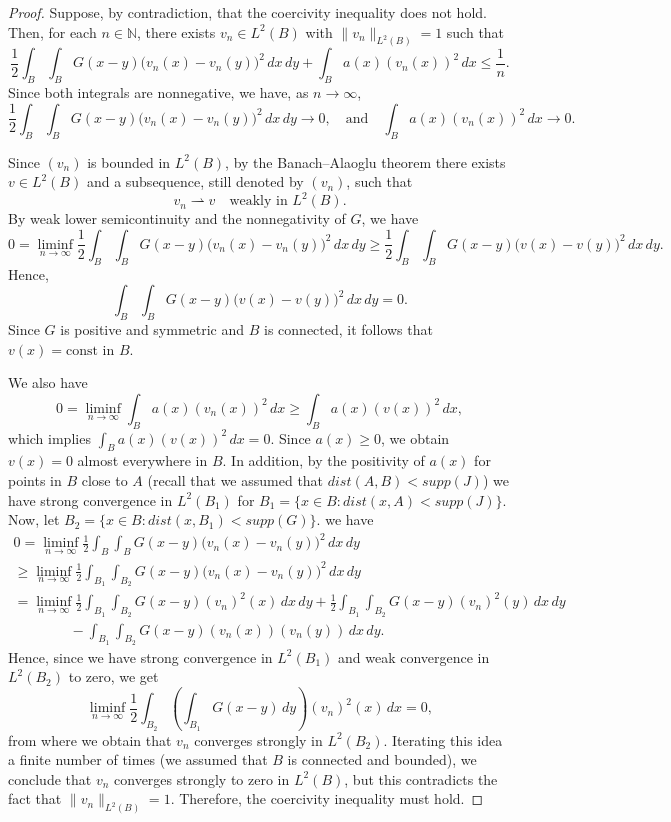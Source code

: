 \documentclass[reqno]{amsart}
\numberwithin{equation}{section}
\begin{document}
\begin{proof}
Suppose, by contradiction, that the coercivity inequality does not hold. 
Then, for each $n \in \mathbb{N}$, there exists $v_n \in L^2(B)$ with $\|v_n\|_{L^2(B)} = 1$ such that
\[
\frac{1}{2}\int_{B}\int_{B} G(x-y)\bigl(v_n(x)-v_n(y)\bigr)^2 \,dx\,dy
+ \int_B a(x) (v_n(x))^2 \,dx \le \frac{1}{n}.
\]
Since both integrals are nonnegative, we have, as $n \to \infty$, 
\[
\frac{1}{2}\int_{B}\int_{B} G(x-y)\bigl(v_n(x)-v_n(y)\bigr)^2 \,dx\,dy \longrightarrow 0,
\quad \text{and} \quad
\int_B a(x) (v_n(x))^2 \,dx \longrightarrow 0.
\]

Since $(v_n)$ is bounded in $L^2(B)$, by the Banach--Alaoglu theorem there exists $v \in L^2(B)$ and a subsequence, still denoted by $(v_n)$, such that
\[
v_n \rightharpoonup v \quad \text{weakly in } L^2(B).
\]
By weak lower semicontinuity and the nonnegativity of $G$, we have
\[
0 = \liminf_{n \to \infty} 
\frac{1}{2}\int_{B}\int_{B} G(x-y)\bigl(v_n(x)-v_n(y)\bigr)^2 \,dx\,dy
\ge \frac{1}{2}\int_{B}\int_{B} G(x-y)\bigl(v(x)-v(y)\bigr)^2 \,dx\,dy.
\]
Hence,
\[
\int_{B}\int_{B} G(x-y)\bigl(v(x)-v(y)\bigr)^2 \,dx\,dy = 0.
\]
Since $G$ is positive and symmetric and $B$ is connected, it follows that $v(x) = \text{const}$ in $B$. 

We also have
\[
0 = \liminf_{n \to \infty} \int_B a(x) (v_n(x))^2 \,dx 
\geq \int_B a(x) (v(x))^2 \,dx,
\]
which implies $\int_B a(x) (v(x))^2 \,dx = 0$.
Since $a(x) \ge 0$, we obtain $v(x) = 0$ almost everywhere in $B$.
In addition, by the positivity of $a(x)$ for points in $B$ close to $A$ (recall that we assumed that
$dist(A,B) < supp(J)$) we have strong convergence in $L^2 (B_1)$ for $B_1 = \{x\in B : dist(x,A) < supp(J)\}$.
Now, let $B_2 = \{x\in B : dist(x,B_1) < supp(G)\}$. we have
\[
\begin{array}{l}
\displaystyle 0 = \liminf_{n \to \infty} 
\frac{1}{2}\int_{B}\int_{B} G(x-y)\bigl(v_n(x)-v_n(y)\bigr)^2 \,dx\,dy \\[10pt]
\displaystyle
\geq \liminf_{n \to \infty} 
\frac{1}{2}\int_{B_1}\int_{B_2} G(x-y)\bigl(v_n(x)-v_n(y)\bigr)^2 \,dx\,dy
\\[10pt]
\displaystyle = 
\liminf_{n \to \infty} 
\frac{1}{2}\int_{B_1}\int_{B_2} G(x-y) (v_n)^2 (x) \,dx\,dy
+ \frac{1}{2}\int_{B_1}\int_{B_2} G(x-y) (v_n)^2 (y) \,dx\,dy 
\\[10pt]
\displaystyle \qquad \qquad - 
\int_{B_1}\int_{B_2} G(x-y) (v_n(x))(v_n(y)) \,dx\,dy.
\end{array}
\]
Hence, since we have strong convergence in $L^2 (B_1)$ and weak
convergence in $L^2 (B_2)$ to zero, we get
$$
\liminf_{n \to \infty} 
\frac{1}{2}\int_{B_2} \left(\int_{B_1} G(x-y) \, dy \right) (v_n)^2 (x) \,dx =0,
$$
from where we obtain that $v_n$ converges strongly in $L^2 (B_2)$. 
Iterating this idea a finite number of times (we assumed that $B$ is connected and bounded), we conclude that
$v_n$ converges strongly to zero in $L^2 (B)$, but this contradicts the fact that $\|v_n\|_{L^2(B)} = 1$.
Therefore, the coercivity inequality must hold.
\end{proof}
\end{document}
